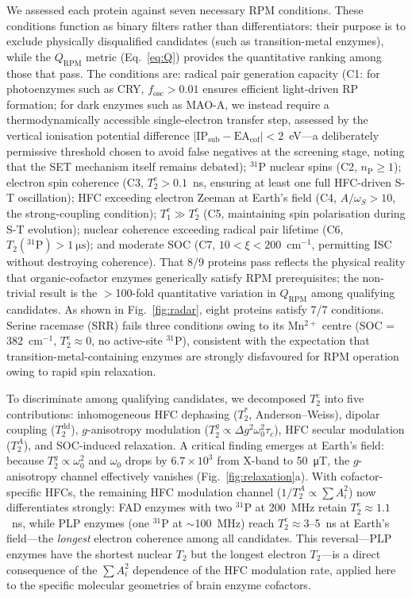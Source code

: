 \documentclass[11pt]{article}
\begin{document}
We assessed each protein against seven necessary RPM conditions. These conditions function as binary filters rather than differentiators: their purpose is to exclude physically disqualified candidates (such as transition-metal enzymes), while the $Q_\mathrm{RPM}$ metric (Eq.~\ref{eq:Q}) provides the quantitative ranking among those that pass. The conditions are: radical pair generation capacity (C1: for photoenzymes such as CRY, $f_\mathrm{osc} > 0.01$ ensures efficient light-driven RP formation; for dark enzymes such as MAO-A, we instead require a thermodynamically accessible single-electron transfer step, assessed by the vertical ionisation potential difference $|\mathrm{IP}_\mathrm{sub} - \mathrm{EA}_\mathrm{cof}| < 2$~eV---a deliberately permissive threshold chosen to avoid false negatives at the screening stage, noting that the SET mechanism itself remains debated\cite{Ramsay1991}); $^{31}$P nuclear spins (C2, $n_\mathrm{P} \geq 1$); electron spin coherence (C3, $T_2^e > 0.1$~ns, ensuring at least one full HFC-driven S-T oscillation); HFC exceeding electron Zeeman at Earth's field (C4, $A/\omega_S > 10$, the strong-coupling condition); $T_1^e \gg T_2^e$ (C5, maintaining spin polarisation during S-T evolution); nuclear coherence exceeding radical pair lifetime (C6, $T_2(^{31}\mathrm{P}) > 1~\si{\micro\second}$); and moderate SOC (C7, $10 < \xi < 200$~cm$^{-1}$, permitting ISC without destroying coherence). That 8/9 proteins pass reflects the physical reality that organic-cofactor enzymes generically satisfy RPM prerequisites; the non-trivial result is the $>$100-fold quantitative variation in $Q_\mathrm{RPM}$ among qualifying candidates. As shown in Fig.~\ref{fig:radar}, eight proteins satisfy 7/7 conditions. Serine racemase (SRR) fails three conditions owing to its Mn$^{2+}$ centre (SOC = 382~cm$^{-1}$, $T_2^e \approx 0$, no active-site $^{31}$P), consistent with the expectation that transition-metal-containing enzymes are strongly disfavoured for RPM operation owing to rapid spin relaxation\cite{Steiner1989}.

To discriminate among qualifying candidates, we decomposed $T_2^e$ into five contributions: inhomogeneous HFC dephasing ($T_2^*$, Anderson--Weiss\cite{Abragam1961}), dipolar coupling ($T_2^\mathrm{dd}$), $g$-anisotropy modulation ($T_2^g \propto \Delta g^2 \omega_0^2 \tau_c$), HFC secular modulation ($T_2^A$), and SOC-induced relaxation. A critical finding emerges at Earth's field: because $T_2^g \propto \omega_0^2$ and $\omega_0$ drops by $6.7 \times 10^3$ from X-band to 50~\si{\micro\tesla}, the $g$-anisotropy channel effectively vanishes (Fig.~\ref{fig:relaxation}a). With cofactor-specific HFCs, the remaining HFC modulation channel ($1/T_2^A \propto \sum A_i^2$) now differentiates strongly: FAD enzymes with two $^{31}$P at 200~MHz retain $T_2^e \approx 1.1$~ns, while PLP enzymes (one $^{31}$P at $\sim$100~MHz) reach $T_2^e \approx 3$--5~ns at Earth's field---the \emph{longest} electron coherence among all candidates. This reversal---PLP enzymes have the shortest nuclear $T_2$ but the longest electron $T_2$---is a direct consequence of the $\sum A_i^2$ dependence of the HFC modulation rate\cite{Abragam1961}, applied here to the specific molecular geometries of brain enzyme cofactors.
\end{document}
